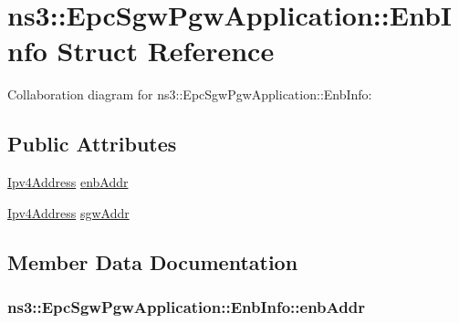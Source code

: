 \hypertarget{structns3_1_1EpcSgwPgwApplication_1_1EnbInfo}{}\section{ns3\+:\+:Epc\+Sgw\+Pgw\+Application\+:\+:Enb\+Info Struct Reference}
\label{structns3_1_1EpcSgwPgwApplication_1_1EnbInfo}


Collaboration diagram for ns3\+:\+:Epc\+Sgw\+Pgw\+Application\+:\+:Enb\+Info\+:
\subsection*{Public Attributes}
\begin{DoxyCompactItemize}
\item 
\hyperlink{classns3_1_1Ipv4Address}{Ipv4\+Address} \hyperlink{structns3_1_1EpcSgwPgwApplication_1_1EnbInfo_a91f7c315f895553358adedce5bea1952}{enb\+Addr}
\item 
\hyperlink{classns3_1_1Ipv4Address}{Ipv4\+Address} \hyperlink{structns3_1_1EpcSgwPgwApplication_1_1EnbInfo_a28e1e6acf7bea3aa8488f98e2e69e546}{sgw\+Addr}
\end{DoxyCompactItemize}


\subsection{Member Data Documentation}
\subsubsection[{\texorpdfstring{enb\+Addr}{enbAddr}}]{ ns3\+::\+Epc\+Sgw\+Pgw\+Application\+::\+Enb\+Info\+::enb\+Addr}\hypertarget{structns3_1_1EpcSgwPgwApplication_1_1EnbInfo_a91f7c315f895553358adedce5bea1952}{}\label{structns3_1_1EpcSgwPgwApplication_1_1EnbInfo_a91f7c315f895553358adedce5bea1952}
